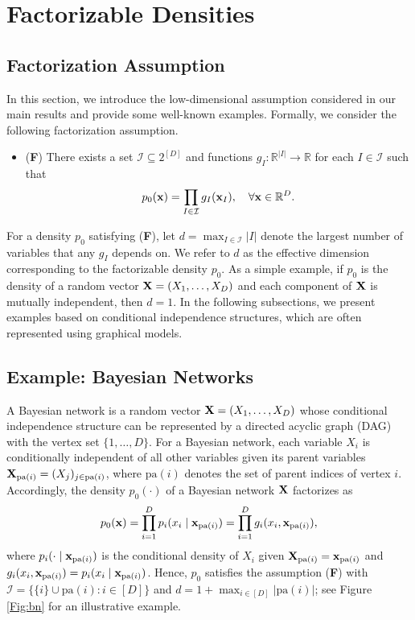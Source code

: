 \documentclass[twoside,11pt]{article}
\def\cI{\mathcal I}
\newcommand{\bF}{{\bf F}}
\newcommand{\bx}{{\bf x}}
\newcommand{\bX}{{\bf X}}
\newcommand{\bbR}{{\mathbb R}}
\newcommand{\bean}{\setlength\arraycolsep{1pt}\begin{eqnarray*}}
\newcommand{\eean}{\end{eqnarray*}}
\newcommand{\bed}{\begin{itemize}}
\newcommand{\eed}{\end{itemize}}
\begin{document}
\section{Factorizable Densities}
\label{sec:factassm}

\subsection{Factorization Assumption}

In this section, we introduce the low-dimensional assumption considered in our main results and provide some well-known examples. Formally, we consider the following factorization assumption.

\bed
\item[] (\bF) There exists a set $\cI \subseteq 2^{[D]}$ and functions $g_{I} : \bbR^{\vert I \vert} \to \bbR$ for each $I \in \cI$ such that
\bean
p_0(\bx) = \prod_{I \in \cI} g_{I}(\bx_{I}), \quad \forall \bx \in \bbR^D.
\eean
\eed

For a density $p_0$ satisfying (\bF), let $d = \max_{I \in \cI} \vert I \vert$ denote the largest number of variables that any $g_I$ depends on.
We refer to $d$ as the effective dimension corresponding to the factorizable density $p_0$.
As a simple example, if $p_0$ is the density of a random vector $\bX = (X_1, \ldots, X_D)$ and each component of $\bX$ is mutually independent, then $d = 1$.
In the following subsections, we present examples based on conditional independence structures, which are often represented using graphical models.


\subsection{Example: Bayesian Networks}

A Bayesian network is a random vector $\bX = (X_1,\ldots,X_{D})$ whose conditional independence structure can be represented by a directed acyclic graph (DAG) with the vertex set $\{1,\ldots,D\}$.
For a Bayesian network, each variable $X_{i} $ is conditionally independent of all other variables given its parent variables $\bX_{\text{pa}(i)} =  ( X_{j})_{ j \in \text{pa}(i) }$, where $\text{pa}(i)$ denotes the set of parent indices of vertex $i$.
Accordingly, the density $p_0(\cdot)$ of a Bayesian network $\bX$ factorizes as
\bean
p_0 ( \bx) = \prod_{i=1}^{D}  p_{i } ( x_i \mid \bx_{ \text{pa} (i) } ) 
= \prod_{i=1}^{D}  g_{i } ( x_i, \bx_{ \text{pa} (i) } ),
\eean
where $ p_{i } ( \cdot \mid \bx_{ \text{pa} (i) } )$ is the conditional density of $X_i$ given $\bX_{\text{pa}(i)} = \bx_{\text{pa}(i)} $ and $g_{i } ( x_i, \bx_{ \text{pa} (i) } ) = p_{i } ( x_i \mid \bx_{ \text{pa} (i) } )$. 
Hence, $p_0$ satisfies the assumption (\bF) with $\cI = \{ \{i\} \cup \text{pa}(i) : i \in [D]  \}$ and $ d = 1 + \max_{i \in [D]} \vert \text{pa}(i) \vert $; see Figure \ref{Fig:bn} for an illustrative example.
\end{document}
